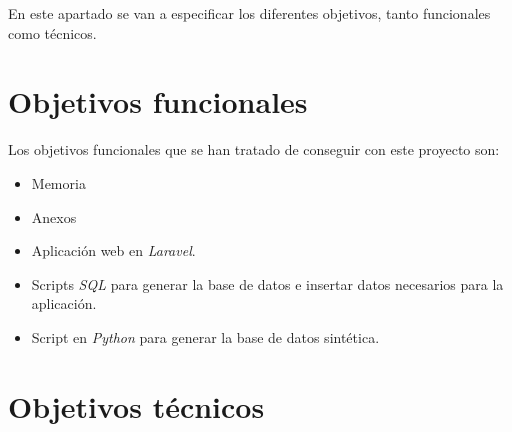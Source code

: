 
En este apartado se van a especificar los diferentes objetivos, tanto funcionales como técnicos.

\section{Objetivos funcionales}

Los objetivos funcionales que se han tratado de conseguir con este proyecto son:

\begin{itemize}
	\item Memoria
	\item Anexos 
	\item Aplicación web en \textit{Laravel}.
	\item Scripts \textit{SQL} para generar la base de datos e insertar datos necesarios para la aplicación.
	\item Script en \textit{Python} para generar la base de datos sintética.
\end{itemize}
\section{Objetivos técnicos}